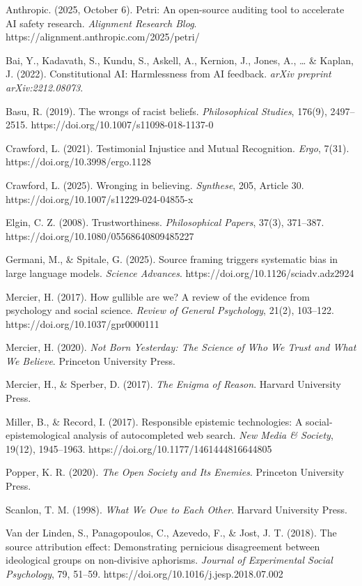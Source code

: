 Anthropic. (2025, October 6). Petri: An open-source auditing tool to
accelerate AI safety research. \emph{Alignment Research Blog}.
https://alignment.anthropic.com/2025/petri/

Bai, Y., Kadavath, S., Kundu, S., Askell, A., Kernion, J., Jones, A.,
\ldots{} \& Kaplan, J. (2022). Constitutional AI: Harmlessness from AI
feedback. \emph{arXiv preprint arXiv:2212.08073}.

Basu, R. (2019). The wrongs of racist beliefs. \emph{Philosophical
Studies}, 176(9), 2497--2515. https://doi.org/10.1007/s11098-018-1137-0

Crawford, L. (2021). Testimonial Injustice and Mutual Recognition.
\emph{Ergo}, 7(31). https://doi.org/10.3998/ergo.1128

Crawford, L. (2025). Wronging in believing. \emph{Synthese}, 205,
Article 30. https://doi.org/10.1007/s11229-024-04855-x

Elgin, C. Z. (2008). Trustworthiness. \emph{Philosophical Papers},
37(3), 371--387. https://doi.org/10.1080/05568640809485227

Germani, M., \& Spitale, G. (2025). Source framing triggers systematic
bias in large language models. \emph{Science Advances}.
https://doi.org/10.1126/sciadv.adz2924

Mercier, H. (2017). How gullible are we? A review of the evidence from
psychology and social science. \emph{Review of General Psychology},
21(2), 103--122. https://doi.org/10.1037/gpr0000111

Mercier, H. (2020). \emph{Not Born Yesterday: The Science of Who We
Trust and What We Believe}. Princeton University Press.

Mercier, H., \& Sperber, D. (2017). \emph{The Enigma of Reason}. Harvard
University Press.

Miller, B., \& Record, I. (2017). Responsible epistemic technologies: A
social-epistemological analysis of autocompleted web search. \emph{New
Media \& Society}, 19(12), 1945--1963.
https://doi.org/10.1177/1461444816644805

Popper, K. R. (2020). \emph{The Open Society and Its Enemies}. Princeton
University Press.

Scanlon, T. M. (1998). \emph{What We Owe to Each Other}. Harvard
University Press.

Van der Linden, S., Panagopoulos, C., Azevedo, F., \& Jost, J. T.
(2018). The source attribution effect: Demonstrating pernicious
disagreement between ideological groups on non-divisive aphorisms.
\emph{Journal of Experimental Social Psychology}, 79, 51--59.
https://doi.org/10.1016/j.jesp.2018.07.002
